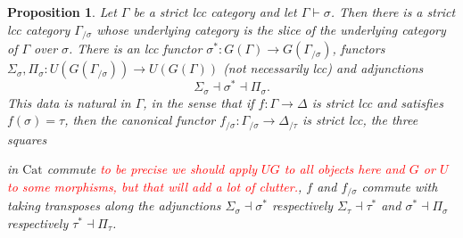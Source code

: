 \documentclass[a4paper]{article}
\newcommand{\todo}[1]{\textcolor{red}{#1}}
\newtheorem{proposition}[theorem]{Proposition}
\theoremstyle{remark}
\theoremstyle{definition}
\begin{document}
\begin{proposition}
  \label{prop:strict-slicing}
  Let $\Gamma$ be a strict lcc category and let $\Gamma \vdash \sigma$.
  Then there is a strict lcc category $\Gamma_{/ \sigma}$ whose underlying category is the slice of the underlying category of $\Gamma$ over $\sigma$.
  There is an lcc functor $\sigma^* : G(\Gamma) \rightarrow G(\Gamma_{/ \sigma})$, functors $\Sigma_\sigma, \Pi_\sigma : U(G(\Gamma_{/ \sigma})) \rightarrow U(G(\Gamma))$ (not necessarily lcc) and adjunctions
  \begin{equation}
    \Sigma_\sigma \dashv \sigma^* \dashv \Pi_\sigma.
  \end{equation}
  This data is natural in $\Gamma$, in the sense that if $f : \Gamma \rightarrow \Delta$ is strict lcc and satisfies $f(\sigma) = \tau$, then the canonical functor $f_{/ \sigma} : \Gamma_{/ \sigma} \rightarrow \Delta_{/ \tau}$ is strict lcc, the three squares
  in $\mathrm{Cat}$ commute \todo{to be precise we should apply $UG$ to all objects here and $G$ or $U$ to some morphisms, but that will add a lot of clutter.}, $f$ and $f_{/ \sigma}$ commute with taking transposes along the adjunctions $\Sigma_\sigma \dashv \sigma^*$ respectively $\Sigma_\tau \dashv \tau^*$ and $\sigma^* \dashv \Pi_\sigma$ respectively $\tau^* \dashv \Pi_\tau$.
\end{proposition}
\end{document}
